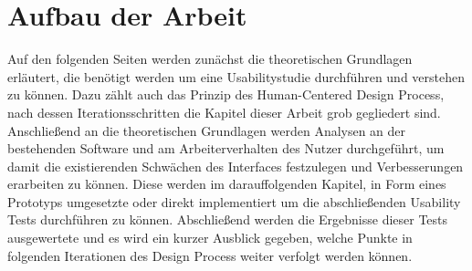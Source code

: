 \section{Aufbau der Arbeit}
Auf den folgenden Seiten werden zunächst die theoretischen Grundlagen erläutert, die benötigt werden um eine Usabilitystudie durchführen und verstehen zu können.
Dazu zählt auch das Prinzip des Human-Centered Design Process, nach dessen Iterationsschritten die Kapitel dieser Arbeit grob gegliedert sind.
Anschließend an die theoretischen Grundlagen werden Analysen an der bestehenden Software und am Arbeiterverhalten des Nutzer durchgeführt, um damit die existierenden Schwächen des Interfaces festzulegen und Verbesserungen erarbeiten zu können.
Diese werden im darauffolgenden Kapitel, in Form eines Prototyps umgesetzte oder direkt implementiert um die abschließenden Usability Tests durchführen zu können.
Abschließend werden die Ergebnisse dieser Tests ausgewertete und es wird ein kurzer Ausblick gegeben, welche Punkte in folgenden Iterationen des Design Process weiter verfolgt werden können.
